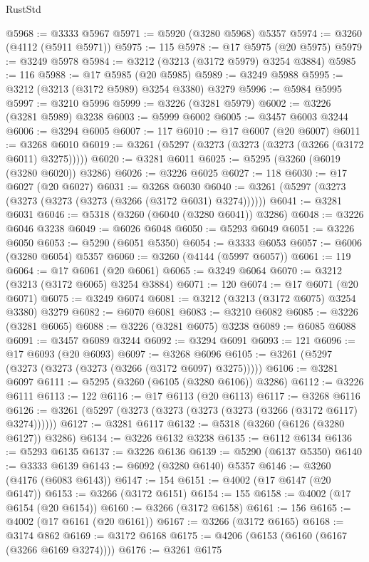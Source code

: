 \begin{lexlean}{RustStd}
\begin{coremodule}
{\begin{coremodule}
{{{{{{{{{{{{{{{{{{{{{{{{{{@5968 := @3333 @5967
@5971 := @5920 (@3280 @5968) @5357
@5974 := @3260 (@4112 (@5911 @5971))
@5975 := 115
@5978 := @17 @5975 (@20 @5975)
@5979 := @3249 @5978
@5984 := @3212 (@3213 (@3172 @5979) @3254 @3884)
@5985 := 116
@5988 := @17 @5985 (@20 @5985)
@5989 := @3249 @5988
@5995 := @3212 (@3213 (@3172 @5989) @3254 @3380) @3279
@5996 := @5984 @5995
@5997 := @3210 @5996
@5999 := @3226 (@3281 @5979)
@6002 := @3226 (@3281 @5989) @3238
@6003 := @5999 @6002
@6005 := @3457 @6003 @3244
@6006 := @3294 @6005
@6007 := 117
@6010 := @17 @6007 (@20 @6007)
@6011 := @3268 @6010
@6019 := @3261 (@5297 (@3273 (@3273 (@3273 (@3266 (@3172 @6011) @3275)))))
@6020 := @3281 @6011
@6025 := @5295 (@3260 (@6019 (@3280 @6020)) @3286)
@6026 := @3226 @6025
@6027 := 118
@6030 := @17 @6027 (@20 @6027)
@6031 := @3268 @6030
@6040 := @3261 (@5297 (@3273 (@3273 (@3273 (@3273 (@3266 (@3172 @6031) @3274))))))
@6041 := @3281 @6031
@6046 := @5318 (@3260 (@6040 (@3280 @6041)) @3286)
@6048 := @3226 @6046 @3238
@6049 := @6026 @6048
@6050 := @5293 @6049
@6051 := @3226 @6050
@6053 := @5290 (@6051 @5350)
@6054 := @3333 @6053
@6057 := @6006 (@3280 @6054) @5357
@6060 := @3260 (@4144 (@5997 @6057))
@6061 := 119
@6064 := @17 @6061 (@20 @6061)
@6065 := @3249 @6064
@6070 := @3212 (@3213 (@3172 @6065) @3254 @3884)
@6071 := 120
@6074 := @17 @6071 (@20 @6071)
@6075 := @3249 @6074
@6081 := @3212 (@3213 (@3172 @6075) @3254 @3380) @3279
@6082 := @6070 @6081
@6083 := @3210 @6082
@6085 := @3226 (@3281 @6065)
@6088 := @3226 (@3281 @6075) @3238
@6089 := @6085 @6088
@6091 := @3457 @6089 @3244
@6092 := @3294 @6091
@6093 := 121
@6096 := @17 @6093 (@20 @6093)
@6097 := @3268 @6096
@6105 := @3261 (@5297 (@3273 (@3273 (@3273 (@3266 (@3172 @6097) @3275)))))
@6106 := @3281 @6097
@6111 := @5295 (@3260 (@6105 (@3280 @6106)) @3286)
@6112 := @3226 @6111
@6113 := 122
@6116 := @17 @6113 (@20 @6113)
@6117 := @3268 @6116
@6126 := @3261 (@5297 (@3273 (@3273 (@3273 (@3273 (@3266 (@3172 @6117) @3274))))))
@6127 := @3281 @6117
@6132 := @5318 (@3260 (@6126 (@3280 @6127)) @3286)
@6134 := @3226 @6132 @3238
@6135 := @6112 @6134
@6136 := @5293 @6135
@6137 := @3226 @6136
@6139 := @5290 (@6137 @5350)
@6140 := @3333 @6139
@6143 := @6092 (@3280 @6140) @5357
@6146 := @3260 (@4176 (@6083 @6143))
@6147 := 154
@6151 := @4002 (@17 @6147 (@20 @6147))
@6153 := @3266 (@3172 @6151)
@6154 := 155
@6158 := @4002 (@17 @6154 (@20 @6154))
@6160 := @3266 (@3172 @6158)
@6161 := 156
@6165 := @4002 (@17 @6161 (@20 @6161))
@6167 := @3266 (@3172 @6165)
@6168 := @3174 @862
@6169 := @3172 @6168
@6175 := @4206 (@6153 (@6160 (@6167 (@3266 @6169 @3274))))
@6176 := @3261 @6175
}}}}}}}}}}}}}}}}}}}}}}}}}}
\end{coremodule}}
\end{coremodule}
\end{lexlean}
